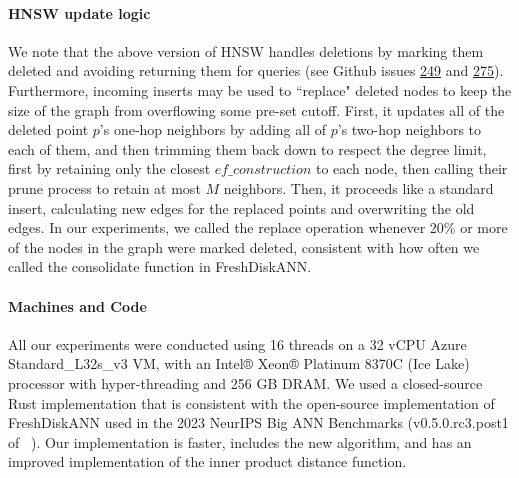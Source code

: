 \paragraph{HNSW update logic}
We note that the above version of HNSW handles deletions by marking them deleted
and avoiding returning them for queries (see Github issues
\href{https://github.com/nmslib/hnswlib/issues/249}{249} and
\href{https://github.com/nmslib/hnswlib/issues/275}{275}).
Furthermore, incoming inserts may be used to ``replace" deleted
nodes to keep the size of the graph from overflowing some pre-set cutoff.
First, it updates all of the deleted point $p$'s one-hop neighbors
by adding all of $p$'s two-hop neighbors to each of them,
and then trimming them back down to respect the degree limit, first by retaining only the closest $ef\_construction$ to each node, then calling their prune process to retain at most $M$ neighbors.
Then, it proceeds like a standard insert, calculating new
edges for the replaced points and overwriting the old edges.
In our experiments, we called the replace operation whenever
20\% or more of the nodes in the graph were marked deleted,
consistent with how often we called the consolidate function in FreshDiskANN.


\paragraph{Machines and Code}
All our experiments were conducted using 16 threads on a 32 vCPU Azure Standard\_L32s\_v3 VM,
with an Intel® Xeon® Platinum 8370C (Ice Lake) processor with hyper-threading
and 256 GB DRAM. We used a closed-source Rust implementation that
is consistent with the open-source implementation of FreshDiskANN 
used in the 2023 NeurIPS Big ANN Benchmarks (v0.5.0.rc3.post1 of ~\cite{diskann-github}).
Our implementation is faster, includes the new \name algorithm,
and has an improved implementation of the inner product distance function.


